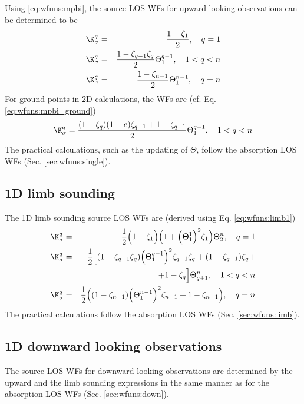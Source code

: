   Using \ref{eq:wfuns:mpbi}, the source LOS WFs for upward looking
  observations can be determined to be
  \begin{eqnarray}
    \K_{\sigma}^q &=& \frac{1-\zeta_1}{2}, \quad q=1 
     \nonumber \\
    \K_{\sigma}^q &=& \frac{1-\zeta_{q-1}\zeta_q}{2} 
                                            \Theta^{q-1}_1, \quad 1<q<n \\
    \K_{\sigma}^q &=& \frac{1-\zeta_{n-1}}{2}\Theta^{n-1}_{1}, \quad q=n
     \nonumber
  \end{eqnarray}
  For ground points in 2D calculations, the WFs are (cf. Eq. 
  \ref{eq:wfuns:mpbi_ground})
  \begin{equation}
    \K_{\sigma}^q = \frac{(1-\zeta_q)(1-e)\zeta_{q-1}+1-\zeta_{q-1}}{2} 
                                            \Theta^{q-1}_1, \quad 1<q<n \\
  \end{equation}
  The practical calculations, such as the updating of $\Theta$, follow the
  absorption LOS WFs (Sec. \ref{sec:wfuns:single}).


 \subsection{1D limb sounding}
  \label{sec:wfuns:limb2}
  The 1D limb sounding source LOS WFs are (derived using Eq.
  \ref{eq:wfuns:limb1})
  \begin{eqnarray}
    \K_{\sigma}^q & = & \frac{1}{2} \Big(1-\zeta_1\Big) \Big(1+
        \Big( \Theta^1_1 \Big)^2\zeta_1 \Big) \Theta^n_2, 
                                                    \quad q=1  \nonumber \\
    \K_{\sigma}^q & = & \frac{1}{2} \Big[ (1-\zeta_{q-1}\zeta_q)
           \Big(\Theta^{q-1}_{1}\Big)^2\zeta_{q-1}\zeta_q + 
           (1-\zeta_{q-1})\zeta_q + \nonumber \\
      & & + 1-\zeta_q \Big] \Theta^n_{q+1}, \quad 1<q<n \\
    \K_{\sigma}^q & = & \frac{1}{2} \Big( (1-\zeta_{n-1}) \Big(
           \Theta^{n-1}_{1}\Big)^2\zeta_{n-1} + 1-\zeta_{n-1} \Big), \quad q=n \nonumber
  \end{eqnarray}
  The practical calculations follow the absorption LOS WFs (Sec.
  \ref{sec:wfuns:limb}).


 \subsection{1D downward looking observations}
  \label{sec:wfuns:down2}
  The source LOS WFs for downward looking observations are determined
  by the upward and the limb sounding expressions in the same manner
  as for the absorption LOS WFs (Sec. \ref{sec:wfuns:down}).

